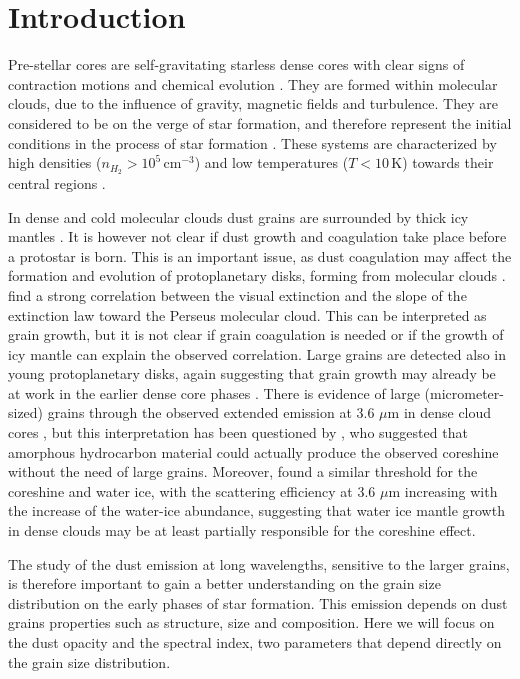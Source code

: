 \documentclass{aa}
\begin{document}
\section{Introduction}


Pre-stellar cores are self-gravitating starless dense cores with clear signs of contraction motions and chemical evolution . They are formed within molecular clouds, due to the influence of gravity, magnetic fields and turbulence. They are considered to be on the verge of star formation, and therefore represent the initial conditions in the process of star formation . These systems are characterized by high densities ($n_{H_2}>10^5$\,cm$^{-3}$) and low temperatures ($T<10$\,K) towards their central regions . 

In dense and cold molecular clouds dust grains are surrounded by thick icy mantles \citep[e.g.][and references therein]{2015ARA&A..53..541B}. It is however not clear if dust growth and coagulation take place before a protostar is born. This is an important issue, as dust coagulation may affect the formation and evolution of protoplanetary disks, forming from molecular clouds .  find a strong correlation between the visual extinction and the slope of the extinction law toward the Perseus molecular cloud. This can be interpreted as grain growth, but it is not clear if grain coagulation is needed or if the growth of icy mantle can explain the observed correlation. Large grains are detected also in young protoplanetary disks, again suggesting that grain growth may already be at work in the earlier dense core phases . There is evidence of large (micrometer-sized) grains through the observed extended emission at 3.6 $\mu$m in dense cloud cores \citep[the so-called coreshine effect]{2010Sci...329.1622P}, but this interpretation has been questioned by , who suggested that amorphous hydrocarbon material could actually produce the observed coreshine without the need of large grains.  Moreover,  found a similar threshold for the coreshine and water ice, with the scattering efficiency at 3.6 $\mu$m increasing with the increase of the water-ice abundance, suggesting that water ice mantle growth in dense clouds may be at least partially responsible for the coreshine effect. 

The study of the dust emission at long wavelengths, sensitive to the larger grains, is therefore important to gain a better understanding on the grain size distribution on the early phases of star formation. This emission depends on dust grains properties such as structure, size and composition. Here we will focus on the dust opacity and the spectral index, two parameters that depend directly on the grain size distribution. 
\end{document}
